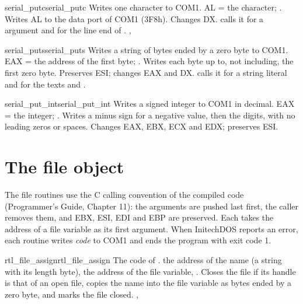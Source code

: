 \begin{RtlEntry}{serial_putc}{serial\_putc}
\LFunction Writes one character to COM1.
\LCalling AL = the character; .
\LRemarks Writes AL to the data port of COM1 (3F8h).  Changes DX.
 calls it for a  argument and for the line end
of .
\LSeeAlso {}, 
\end{RtlEntry}

\begin{RtlEntry}{serial_puts}{serial\_puts}
\LFunction Writes a string of bytes ended by a zero byte to COM1.
\LCalling EAX = the address of the first byte; .
\LRemarks Writes each byte up to, not including, the first zero byte.
Preserves ESI; changes EAX and DX.   calls it for a string
literal and for the texts  and .
\LSeeAlso {}
\end{RtlEntry}

\begin{RtlEntry}{serial_put_int}{serial\_put\_int}
\LFunction Writes a signed integer to COM1 in decimal.
\LCalling EAX = the integer; .
\LRemarks Writes a minus sign for a negative value, then the digits, with
no leading zeros or spaces.  Changes EAX, EBX, ECX and EDX; preserves ESI.
\LSeeAlso {}
\end{RtlEntry}

\section{The file object}
The file routines use the C calling convention of the compiled code
(Programmer's Guide, Chapter 11): the arguments are pushed last first, the
caller removes them, and EBX, ESI, EDI and EBP are preserved.  Each takes
the address of a file variable as its first argument.  When InitechDOS
reports an error, each routine writes \textit{code}
to COM1 and ends the program with exit code 1.

\begin{RtlEntry}{rtl_file_assign}{rtl\_file\_assign}
\LFunction The code of .
\LCalling {} the address of the name (a string with its length
byte),  the address of the file variable, .
\LRemarks Closes the file if its handle is that of an open file, copies the
name into the file variable as bytes ended by a zero byte, and marks the
file closed.
\LSeeAlso {}, 
\end{RtlEntry}

